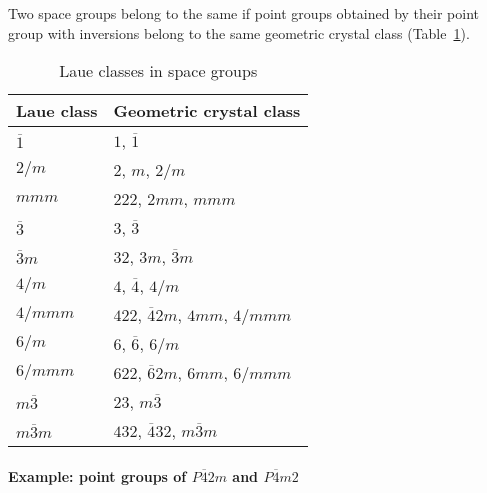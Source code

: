 Two space groups belong to the same  if point groups obtained by their point group with inversions belong to the same geometric crystal class (Table~\ref{tab:laue_class}).

\begin{table}[htb]
  \centering
  \caption{Laue classes in space groups}
  \label{tab:laue_class}
  \begin{tabular}[h]{l|l}
    \hline
    Laue class       & Geometric crystal class \\ \hline
    $\overline{1}$   & $1$, $\overline{1}$ \\
    $2/m$            & $2$, $m$, $2/m$ \\
    $mmm$            & $222$, $2mm$, $mmm$ \\
    $\overline{3}$   & $3$, $\overline{3}$ \\
    $\overline{3}m$  & $32$, $3m$, $\overline{3}m$ \\
    $4/m$            & $4$, $\overline{4}$, $4/m$ \\
    $4/mmm$          & $422$, $\overline{4}2m$, $4mm$, $4/mmm$ \\
    $6/m$            & $6$, $\overline{6}$, $6/m$ \\
    $6/mmm$          & $622$, $\overline{6}2m$, $6mm$, $6/mmm$ \\
    $m\overline{3}$  & $23$, $m\overline{3}$ \\
    $m\overline{3}m$ & $432$, $\overline{4}32$, $m\overline{3}m$ \\ \hline
  \end{tabular}
\end{table}

\paragraph{Example: point groups of $P\overline{4}2m$ and $P\overline{4}m2$}

